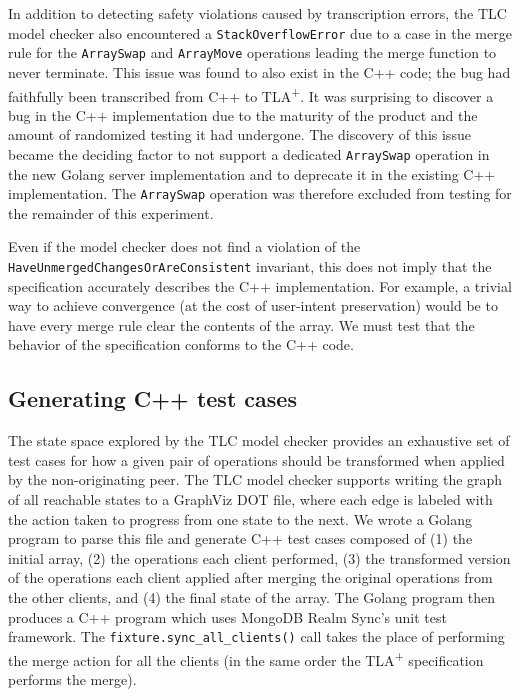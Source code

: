 \documentclass{vldb}
\begin{document}
In addition to detecting safety violations caused by transcription errors, the TLC model checker also encountered a \texttt{StackOverflowError} due to a case in the merge rule for the \texttt{ArraySwap} and \texttt{ArrayMove} operations leading the merge function to never terminate. This issue was found to also exist in the C++ code; the bug had faithfully been transcribed from C++ to TLA\textsuperscript{+}. It was surprising to discover a bug in the C++ implementation due to the maturity of the product and the amount of randomized testing it had undergone.
The discovery of this issue became the deciding factor to not support a dedicated \texttt{ArraySwap} operation in the new Golang server implementation and to deprecate it in the existing C++ implementation. The \texttt{ArraySwap} operation was therefore excluded from testing for the remainder of this experiment.

Even if the model checker does not find a violation of the \texttt{HaveUnmergedChangesOrAreConsistent} invariant, this does not imply that the specification accurately describes the C++ implementation.
For example, a trivial way to achieve convergence (at the cost of user-intent preservation) would be to have every merge rule clear the contents of the array. We must test that the behavior of the specification conforms to the C++ code.

\subsection{Generating C++ test cases}
\label{subsec:mbtcg_cpp}

The state space explored by the TLC model checker provides an exhaustive set of test cases for how a given pair of operations should be transformed when applied by the non-originating peer. The TLC model checker supports writing the graph of all reachable states to a GraphViz DOT file, where each edge is labeled with the action taken to progress from one state to the next. We wrote a Golang program to parse this file and generate C++ test cases composed of (1) the initial array, (2) the operations each client performed, (3) the transformed version of the operations each client applied after merging the original operations from the other clients, and (4) the final state of the array. The Golang program then produces a C++ program which uses MongoDB Realm Sync's unit test framework. The \texttt{fixture.sync\_all\_clients()} call takes the place of performing the merge action for all the clients (in the same order the TLA\textsuperscript{+} specification performs the merge).
\end{document}
